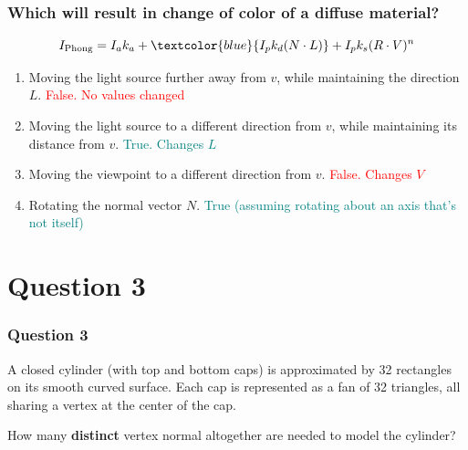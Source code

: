 \documentclass{beamer}
\begin{document}
\begin{frame}
    \frametitle{Which will result in change of color of a diffuse material?}

    \begin{equation*}
        I_\text{Phong} = I_a k_a + \textcolor{blue}{I_p k_d  (N \cdot L)} + I_p k_s (R \cdot V)^n
    \end{equation*}

    \begin{enumerate}
        \item Moving the light source further away from $v$, while maintaining the direction $L$. \textcolor{red}{False. No values changed}
        \item Moving the light source to a different direction from $v$, while maintaining its distance from $v$. \textcolor{teal}{True. Changes $L$}
        \item Moving the viewpoint to a different direction from $v$. \textcolor{red}{False. Changes $V$}
        \item Rotating the normal vector $N$. \textcolor{teal}{True (assuming rotating about an axis that's not itself)}
    \end{enumerate}

\end{frame}

\section{Question 3}

\begin{frame}
    \frametitle{Question 3}


    A closed cylinder (with top and bottom caps) is approximated by 32 rectangles on its 
    smooth curved surface. 
    Each cap is represented as a fan of 32 triangles, 
    all sharing a vertex at the center of the cap. 

    \vspace*{1em}

    How many \textbf{distinct} vertex normal altogether are needed to model the cylinder?

\end{frame}
\end{document}
